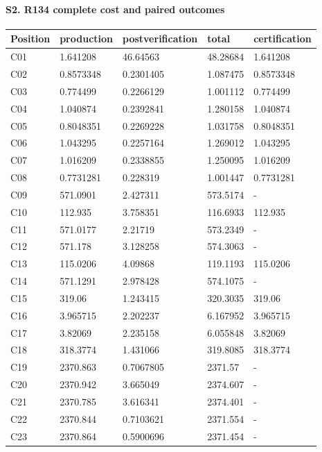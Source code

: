 \documentclass[
  american,
  11pt,
]{article}
\newcounter{none} %
\begin{document}
\paragraph{S2. R134 complete cost and paired
outcomes}\label{s2.-r134-complete-cost-and-paired-outcomes}

{\def\LTcaptype{none} %
\begin{longtable}[]{@{}lllll@{}}
\toprule\noalign{}
Position & production & postverification & total & certification \\
\midrule\noalign{}
\endhead
\bottomrule\noalign{}
\endlastfoot
C01 & 1.641208 & 46.64563 & 48.28684 & 1.641208 \\
C02 & 0.8573348 & 0.2301405 & 1.087475 & 0.8573348 \\
C03 & 0.774499 & 0.2266129 & 1.001112 & 0.774499 \\
C04 & 1.040874 & 0.2392841 & 1.280158 & 1.040874 \\
C05 & 0.8048351 & 0.2269228 & 1.031758 & 0.8048351 \\
C06 & 1.043295 & 0.2257164 & 1.269012 & 1.043295 \\
C07 & 1.016209 & 0.2338855 & 1.250095 & 1.016209 \\
C08 & 0.7731281 & 0.228319 & 1.001447 & 0.7731281 \\
C09 & 571.0901 & 2.427311 & 573.5174 & - \\
C10 & 112.935 & 3.758351 & 116.6933 & 112.935 \\
C11 & 571.0177 & 2.21719 & 573.2349 & - \\
C12 & 571.178 & 3.128258 & 574.3063 & - \\
C13 & 115.0206 & 4.09868 & 119.1193 & 115.0206 \\
C14 & 571.1291 & 2.978428 & 574.1075 & - \\
C15 & 319.06 & 1.243415 & 320.3035 & 319.06 \\
C16 & 3.965715 & 2.202237 & 6.167952 & 3.965715 \\
C17 & 3.82069 & 2.235158 & 6.055848 & 3.82069 \\
C18 & 318.3774 & 1.431066 & 319.8085 & 318.3774 \\
C19 & 2370.863 & 0.7067805 & 2371.57 & - \\
C20 & 2370.942 & 3.665049 & 2374.607 & - \\
C21 & 2370.785 & 3.616341 & 2374.401 & - \\
C22 & 2370.844 & 0.7103621 & 2371.554 & - \\
C23 & 2370.864 & 0.5900696 & 2371.454 & - \\

\end{longtable}}
\end{document}
